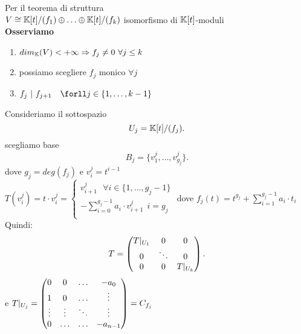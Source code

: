 \documentclass[12px]{article}
\begin{document}
\begin{dimo}
	Per il teorema di struttura \\ $V\cong \K[t]/(f_1)\oplus\ldots\oplus \K[t]/(f_k)$ \hfill isomorfismo di $\K[t]$-moduli\\
	\textbf{Osserviamo}\\
	\begin{enumerate}
		\item $dim_\K(V) < +\infty \Rightarrow  f_j\neq 0 \ \forall j\leq k$ 
		\item possiamo scegliere $f_j$ monico $\forall j$
		\item $f_j \ | \ f_{j+1}\ \ \ \forll j\in\{1,\ldots , k-1\}$\\
	\end{enumerate}
			Consideriamo il sottospazio 
			 \[
				 U_j = \mathbb{K}[t]/(f_j)
			.\] 
			scegliamo base 
			\[
				B_j = \{v_1^j,\ldots,v_{g_j}^j\}
			.\] 
			dove $g_j = deg(f_j)$ e  $v_i^j = t^{i-1}$\\
			 $T(v_i^j) = t\cdot v^j_i= \begin{cases}
				 v_{i+1}^j\ \ \ \forall i\in\{1,\ldots,g_j-1\}\\ 
				 - \sum^{g_j -1}_{i = 0}a_i\cdot v_{i+1}^j \ \ i = g_j\\

			 \end{cases}$
			 dove $f_j(t) = t^{g_j} + \sum^{g_j-1}_{i=1}a_i\cdot t_i$\\
			 Quindi:
			 \[
				 T = \matrice{T|_{U_1}&0&0\\0&\ddots & 0\\
				 0 & 0 & T|_{U_k}}
			 .\] 
				 e $T|_{U_j} = \matrice{0 & 0 &\ldots&- a_0\\
					 1 & 0 & \ldots & \vdots\\
					 \vdots & \vdots & \ddots & \vdots \\
				 0& \ldots & \ldots & -a_{n-1}} = C_{f_j}$
\end{dimo}
\end{document}
